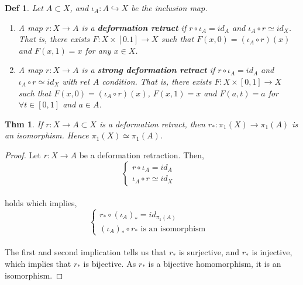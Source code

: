 \documentclass[paper=a4, fontsize=11pt]{scrartcl}
\newtheorem{theorem}{Thm}
\newtheorem{definition}{Def}
\begin{document}
\begin{definition}
	Let $A\subset X$, and $\iota_A : A \hookrightarrow X$ be the inclusion map.
	\begin{enumerate}[label=\arabic*)]
		\item A map $r:X\to A$ is a \textbf{deformation retract} if $r \circ \iota_A = id_A$ and $\iota_A \circ r \simeq id_X$. That is, there exists $F:X\times[0.1] \to X$ such that $F(x,0)=(\iota_A \circ r)(x)$ and $F(x,1)=x$ for any $x\in X$.
		\item A map  $r:X\to A$ is a \textbf{strong deformation retract} if $r \circ \iota_A = id_A$ and $\iota_A \circ r \simeq id_X$ with $rel$ $A$ condition. That is, there exists $F:X \times [0,1] \to X$ such that $F(x,0)=(\iota_A \circ r)(x)$, $F(x,1)=x$ and $F(a,t)=a$ for $\forall t \in [0,1]$ and $a \in A$.
	\end{enumerate}
\end{definition}

\vspace{0.15in}

\begin{theorem}
If $r:X\to A \subset X$ is a deformation retract, then $r_\ast : \pi_1(X) \to \pi_1(A)$ is an isomorphism. Hence $\pi_1(X) \simeq \pi_1(A)$.\\
\end{theorem}

\begin{proof}
	Let $r:X \to A$ be a deformation retraction. Then,\\
	\begin{equation}\nonumber
		\begin{cases}
		r \circ \iota_A= id_A &\\
		\iota_A \circ r \simeq id_X &
		\end{cases}
	\end{equation}\\
	holds which implies,\\
	\begin{equation}\nonumber
		\begin{cases}
		r_\ast \circ (\iota_A)_\ast= id_{\pi_1(A)} &\\
		(\iota_A)_\ast \circ r_\ast \text{ is an isomorphism}&
		\end{cases}
	\end{equation}\\
	The first and second implication tells us that $r_\ast$ is surjective, and $r_\ast$ is injective, which implies that $r_\ast$ is bijective. As $r_\ast$ is a bijective homomorphism, it is an isomorphism.
\end{proof}
\end{document}

